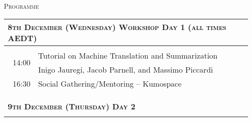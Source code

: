 
\begin{center}

  \large \textsc{Programme}
\end{center}



\begin{longtable}{rl}
\multicolumn{2}{l}{\textsc{\bf 8th December (Wednesday) Workshop Day 1 (all times AEDT)}} \\
\hline \\
  



\multirow{2}{*}{14:00} & Tutorial on Machine Translation and Summarization  \\
                       & Inigo Jauregi, Jacob Parnell, and Massimo Piccardi \\
\multirow{1}{*}{16:30} & Social Gathering/Mentoring – Kumospace  \\
&  \\ \\

\\


\multicolumn{2}{l}{\bf \textsc{ \bf 9th December (Thursday) Day 2}} \\
\hline \\ 


\end{longtable}
